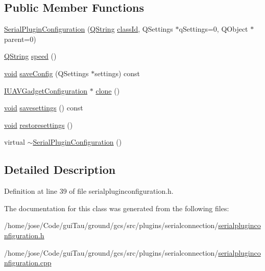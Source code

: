 \subsection*{Public Member Functions}
\begin{DoxyCompactItemize}
\item 
\hyperlink{group___serial_plugin_ga15a723a8f3215c718070ef32ea6fff2e}{Serial\-Plugin\-Configuration} (\hyperlink{group___u_a_v_objects_plugin_gab9d252f49c333c94a72f97ce3105a32d}{Q\-String} \hyperlink{group___core_plugin_gac953657221ba7fda967ada0408332641}{class\-Id}, Q\-Settings $\ast$q\-Settings=0, Q\-Object $\ast$parent=0)
\item 
\hyperlink{group___u_a_v_objects_plugin_gab9d252f49c333c94a72f97ce3105a32d}{Q\-String} \hyperlink{group___serial_plugin_ga1e6623a11c7e9c8e52411d2568dd4e7c}{speed} ()
\item 
\hyperlink{group___u_a_v_objects_plugin_ga444cf2ff3f0ecbe028adce838d373f5c}{void} \hyperlink{group___serial_plugin_ga01715638b8bff47aaa76961d1cd11f59}{save\-Config} (Q\-Settings $\ast$settings) const 
\item 
\hyperlink{group___core_plugin_gacdfdf0b1e39b5002472b76b6564ce51f}{I\-U\-A\-V\-Gadget\-Configuration} $\ast$ \hyperlink{group___serial_plugin_ga894fb8aa5280cdfb94f844d09f21e64d}{clone} ()
\item 
\hyperlink{group___u_a_v_objects_plugin_ga444cf2ff3f0ecbe028adce838d373f5c}{void} \hyperlink{group___serial_plugin_ga4a63c76785f20677382b69b52b9537f0}{savesettings} () const 
\item 
\hyperlink{group___u_a_v_objects_plugin_ga444cf2ff3f0ecbe028adce838d373f5c}{void} \hyperlink{group___serial_plugin_ga9c071c1ab20bf2139e54c469ab804332}{restoresettings} ()
\item 
virtual \hyperlink{group___serial_plugin_ga02088820254dad5d594d652f0d1ac556}{$\sim$\-Serial\-Plugin\-Configuration} ()
\end{DoxyCompactItemize}


\subsection{Detailed Description}


Definition at line 39 of file serialpluginconfiguration.\-h.



The documentation for this class was generated from the following files\-:\begin{DoxyCompactItemize}
\item 
/home/jose/\-Code/gui\-Tau/ground/gcs/src/plugins/serialconnection/\hyperlink{serialpluginconfiguration_8h}{serialpluginconfiguration.\-h}\item 
/home/jose/\-Code/gui\-Tau/ground/gcs/src/plugins/serialconnection/\hyperlink{serialpluginconfiguration_8cpp}{serialpluginconfiguration.\-cpp}\end{DoxyCompactItemize}
